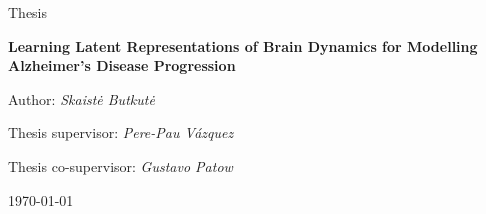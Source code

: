 \begin{titlepage}
  \centering
  \vspace*{3cm}
  {\LARGE Thesis\par}
  \vspace{1.5cm}
  {\huge\bfseries Learning Latent Representations of Brain Dynamics for Modelling Alzheimer’s Disease Progression\par}
  \vfill
  {\large Author: \textit{Skaistė Butkutė}\par}
  \vspace{0.5cm}
  {\large Thesis supervisor: \textit{Pere-Pau Vázquez}\par}
  \vspace{0.5cm}
  {\large Thesis co-supervisor: \textit{Gustavo Patow}\par}
  \vspace{1.5cm}
  {\large \today\par}
\end{titlepage}
